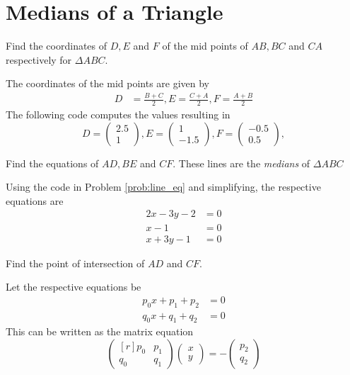 \documentclass[journal,12pt,twocolumn]{IEEEtran}
\begin{document}
\section{Medians of a Triangle}
\begin{problem}
Find the coordinates of $D, E$ and $F$ of the mid points of $AB, BC$ and $CA$ respectively for  $\Delta ABC$. 
\end{problem} 
\solution
The coordinates of the mid points are given by
%
\begin{align}
D &= \frac{B+C}{2}, E = \frac{C+A}{2}, F = \frac{A+B}{2}
\end{align}
%
The following code computes the values resulting in
\begin{equation}
D = \begin{pmatrix}
2.5
\\
1
\end{pmatrix},
E = \begin{pmatrix}
1
\\
-1.5
\end{pmatrix},
F = \begin{pmatrix}
-0.5
\\
0.5
\end{pmatrix},
\end{equation}

\begin{problem}
Find the equations of $AD,BE$ and $CF$. These lines are the {\em medians} of $\Delta ABC$
\end{problem}
\solution Using the code in Problem \ref{prob:line_eq} and simplifying, the respective equations are
\begin{align}
2x -3y-2 &=0
\\
x-1 &= 0
\\
x+3y-1 &=0
\end{align}
%
\begin{problem}
\label{prob:median}
Find the point of intersection of $AD$ and $CF$.
\end{problem}
\solution
Let the respective equations  be
\begin{align}
p_0 x + p_1 + p_2 &= 0
\\
q_0 x + q_1 + q_2 &= 0
\end{align}
This can be written as the matrix equation
\begin{equation}
\begin{pmatrix*}[r]
p_0 & p_1 
\\
q_0 & q_1 
\end{pmatrix*}
\begin{pmatrix}
x
\\
y
\end{pmatrix}
=-
\begin{pmatrix}
p_2
\\
q_2
\end{pmatrix}
\end{equation}
\end{document}
